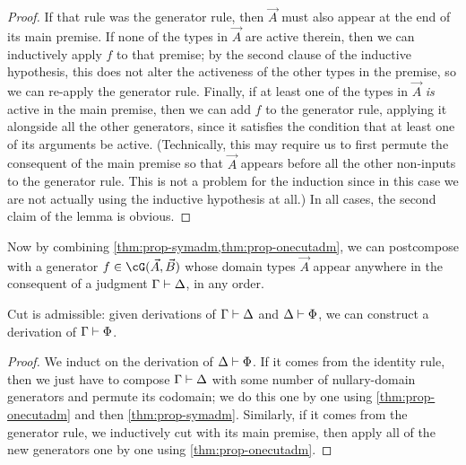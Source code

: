 \begin{props}
\begin{proof}
  If that rule was the generator rule, then $\vec A$ must also appear at the end of its main premise.
  If none of the types in $\vec A$ are active therein, then we can inductively apply $f$ to that premise; by the second clause of the inductive hypothesis, this does not alter the activeness of the other types in the premise, so we can re-apply the generator rule.
  Finally, if at least one of the types in $\vec A$ \emph{is} active in the main premise, then we can add $f$ to the generator rule, applying it alongside all the other generators, since it satisfies the condition that at least one of its arguments be active.
  (Technically, this may require us to first permute the consequent of the main premise so that $\vec A$ appears before all the other non-inputs to the generator rule.
  This is not a problem for the induction since in this case we are not actually using the inductive hypothesis at all.)
  In all cases, the second claim of the lemma is obvious.
\end{proof}

Now by combining \cref{thm:prop-symadm,thm:prop-onecutadm}, we can postcompose with a generator $f\in \cG(\vec A,\vec B)$ whose domain types $\vec A$ appear anywhere in the consequent of a judgment $\Gamma\vdash\Delta$, in any order.

\begin{thm}\label{thm:prop-cutadm}
  Cut is admissible: given derivations of $\Gamma\vdash \Delta$ and $\Delta \vdash \Phi$, we can construct a derivation of $\Gamma\vdash \Phi$.
\end{thm}
\begin{proof}
  We induct on the derivation of $\Delta \vdash \Phi$.
  If it comes from the identity rule, then we just have to compose $\Gamma\vdash \Delta$ with some number of nullary-domain generators and permute its codomain; we do this one by one using \cref{thm:prop-onecutadm} and then \cref{thm:prop-symadm}.
  Similarly, if it comes from the generator rule, we inductively cut with its main premise, then apply all of the new generators one by one using \cref{thm:prop-onecutadm}.
\end{proof}


\end{props}
